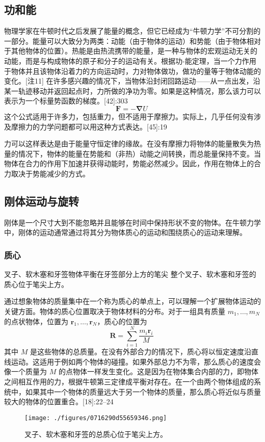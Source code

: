 \subsection{功和能}
物理学家在牛顿时代之后发展了能量的概念，但它已经成为“牛顿力学”不可分割的一部分。能量可以大致分为两类：动能（由于物体的运动）和势能（由于物体相对于其他物体的位置）。热能是由热流携带的能量，是一种与物体的宏观运动无关的动能，而是与构成物体的原子和分子的运动有关。根据功-能定理，当一个力作用于物体并且该物体沿着力的方向运动时，力对物体做功，做功的量等于物体动能的变化。[注11] 在许多感兴趣的情况下，当物体沿封闭回路运动——从一点出发，沿某一轨迹移动并返回起点时，力所做的净功为零。如果是这种情况，那么该力可以表示为一个标量势函数的梯度。[42]:303
\[
\mathbf{F} = -\mathbf{\nabla} U~
\]
这个公式适用于许多力，包括重力，但不适用于摩擦力。实际上，几乎任何没有涉及摩擦力的力学问题都可以用这种方式表达。[45]:19

力可以这样表达是由于能量守恒定律的缘故。在没有摩擦力将物体的能量散失为热量的情况下，物体的能量在势能和（非热）动能之间转换，而总能量保持不变。当物体在合力的作用下加速并获得动能时，势能必然减少。因此，作用在物体上的合力取决于势能减少的方式。
\subsection{刚体运动与旋转} 
刚体是一个尺寸大到不能忽略并且能够在时间中保持形状不变的物体。在牛顿力学中，刚体的运动通常通过将其分为物体质心的运动和围绕质心的运动来理解。
\subsubsection{质心}  
叉子、软木塞和牙签物体平衡在牙签部分上方的笔尖  
整个叉子、软木塞和牙签的质心位于笔尖上方。  

通过想象物体的质量集中在一个称为质心的单点上，可以理解一个扩展物体运动的关键方面。物体的质心位置取决于物体材料的分布。对于一组具有质量 \( m_1, \ldots, m_N \) 的点状物体，位置为 \( \mathbf{r}_1, \ldots, \mathbf{r}_N \)，质心的位置为
\[
\mathbf{R} = \sum_{i=1}^{N} \frac{m_i \mathbf{r}_i}{M}~
\]
其中 \( M \) 是这些物体的总质量。在没有外部合力的情况下，质心将以恒定速度沿直线运动。这适用于例如两个物体的碰撞。如果外部总力不为零，那么质心的速度会像一个质量为 \( M \) 的点物体一样发生变化。这是因为在物体集合内部的力，即物体之间相互作用的力，根据牛顿第三定律成平衡对存在。在一个由两个物体组成的系统中，如果其中一个物体的质量远大于另一个物体的质量，那么质心将近似与质量较大的物体的位置重合。[18]:22–24
\begin{figure}[ht]
\centering
\texttt{[image: ./figures/0716290d55659346.png]}
\caption{叉子、软木塞和牙签的总质心位于笔尖上方。} \label{fig_NEW01_8}
\end{figure}
